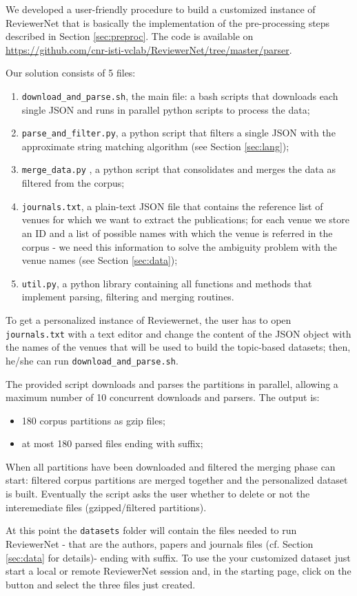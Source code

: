 We developed a user-friendly procedure to build a customized instance of ReviewerNet that is basically the implementation of the pre-processing steps described in Section \ref{sec:preproc}. The code is available on \url{https://github.com/cnr-isti-vclab/ReviewerNet/tree/master/parser}.

Our solution consists of 5 files: 
\begin{enumerate}
\item \texttt{download\_and\_parse.sh}, the main file: a bash scripts that downloads each single JSON and runs in parallel python scripts to process the data;
\item \texttt{parse\_and\_filter.py}, a python script that filters a single JSON with the approximate string matching algorithm (see Section \ref{sec:lang});
\item \texttt{merge\_data.py} , a python script that consolidates and merges the data as filtered from the corpus;
\item \texttt{journals.txt}, a plain-text JSON file that contains the reference list of venues for which we want to extract the publications; for each venue we store an ID and a list of possible names with which the venue is referred in the corpus - we need this information to solve the ambiguity problem with the venue names (see Section \ref{sec:data});
\item \texttt{util.py}, a python library containing all functions and methods that implement parsing, filtering and merging routines.
\end{enumerate}

To get a personalized instance of Reviewernet, the user has to open \texttt{journals.txt} with a text editor and change the content of the JSON object with the names of the venues that will be used to build the topic-based datasets; then, he/she can run \texttt{download\_and\_parse.sh}.

The provided script downloads and parses the partitions in parallel, allowing a maximum number of 10 concurrent downloads and parsers. The output is:


    \begin{itemize}
        \item 180 corpus partitions as gzip files;

        \item at most 180 parsed files ending with  suffix;
    \end{itemize}

When all partitions have been downloaded and filtered the merging phase can start: filtered corpus partitions are merged together and the personalized dataset is built. Eventually the script asks the user whether to delete or not the interemediate files (gzipped/filtered partitions).

At this point the \texttt{datasets} folder will contain the files needed to run ReviewerNet - that are the authors, papers and journals files (cf. Section \ref{sec:data} for details)- ending with  suffix. To use the your customized dataset just start a local or remote ReviewerNet session and, in the starting page, click on the  button and select the three files just created.
